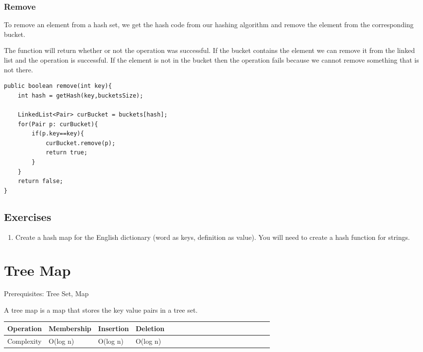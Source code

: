 \documentclass[11pt,oneside]{book}
\begin{document}
\subsubsection{Remove}

To remove an element from a hash set, we get the hash code from our hashing algorithm and remove the element from the corresponding bucket.

The function will return whether or not the operation was successful. If the bucket contains the element we can remove it from the linked list and the operation is successful. If the element is not in the bucket then the operation fails because we cannot remove something that is not there.

\begin{lstlisting}
public boolean remove(int key){
    int hash = getHash(key,bucketsSize);
    
    LinkedList<Pair> curBucket = buckets[hash];
    for(Pair p: curBucket){
        if(p.key==key){
            curBucket.remove(p);
            return true;
        }
    }
    return false;
}
\end{lstlisting}

\subsection{Exercises}

\begin{enumerate}
\item Create a hash map for the English dictionary (word as keys, definition as value). You will need to create a hash function for strings.
\end{enumerate}

        \section{ Tree Map }
        

Prerequisites: Tree Set, Map

A tree map is a map that stores the key value pairs in a tree set.

\vspace{10px}\begin{tabulary}{0.4\linewidth}{|l|l|l|l|l|l|l|l|l|l|l|l|l|l|l|l|l|l|l}\hline


  Operation &
  Membership &
  Insertion &
  Deletion\\
\hline


  Complexity &
  O(log n) &
  O(log n) &
  O(log n)\\

\hline\end{tabulary}
\end{document}
